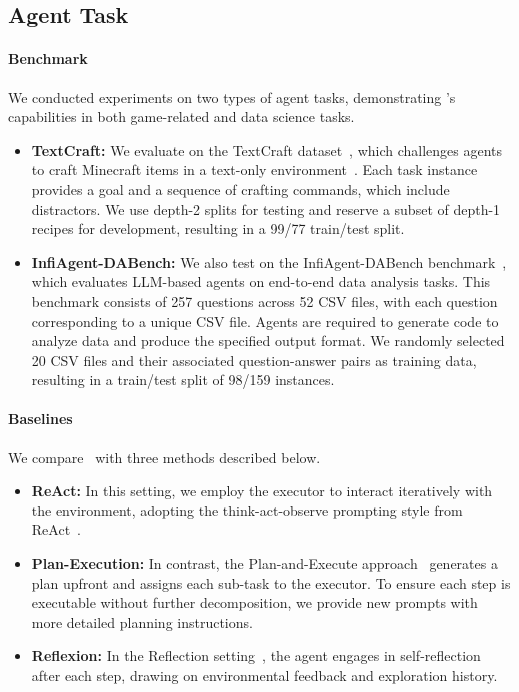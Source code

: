 \subsection{Agent Task}
\label{subsec:agent}
\paragraph{Benchmark}
We conducted experiments on two types of agent tasks, demonstrating {\ours}'s capabilities in both game-related and data science tasks.
\begin{itemize}
     \item \textbf{TextCraft:} We evaluate {\ours} on the TextCraft dataset~\citep{futuyma1988evolution}, which challenges agents to craft Minecraft items in a text-only environment~\citep{cote2019textworld}. Each task instance provides a goal and a sequence of crafting commands, which include distractors. We use depth-2 splits for testing and reserve a subset of depth-1 recipes for development, resulting in a 99/77 train/test split.
    \item \textbf{InfiAgent-DABench:} We also test {\ours} on the InfiAgent-DABench benchmark~\citep{hu2024infiagent}, which evaluates LLM-based agents on end-to-end data analysis tasks. This benchmark consists of 257 questions across 52 CSV files, with each question corresponding to a unique CSV file. Agents are required to generate code to analyze data and produce the specified output format. We randomly selected 20 CSV files and their associated question-answer pairs as training data, resulting in a train/test split of 98/159 instances.
\end{itemize}

\paragraph{Baselines}
We compare \ours\ with three methods described below.
\begin{itemize}
     \item \textbf{ReAct:} In this setting, we employ the executor to interact iteratively with the environment, adopting the think-act-observe prompting style from ReAct~\citep{yao2022react}.
     \item \textbf{Plan-Execution:} In contrast, the Plan-and-Execute approach~\citep{shridhar2023art, yang2023intercode} generates a plan upfront and assigns each sub-task to the executor. To ensure each step is executable without further decomposition, we provide new prompts with more detailed planning instructions.
    \item \textbf{Reflexion:} In the Reflection setting~\citep{shinn2023reflexion}, the agent engages in self-reflection after each step, drawing on environmental feedback and exploration history. 
\end{itemize}

